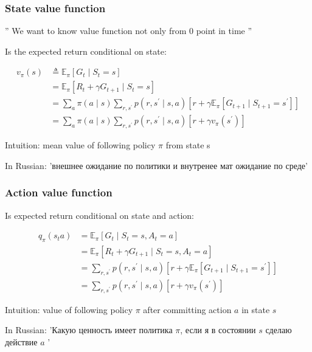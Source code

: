 \documentclass[a4paper,12pt]{article}
\begin{document}
	
	\subsubsection{State value function}
	
	
	''
	We want to know value function not only from 0 point in time
	''
	
	
	Is the expected return conditional on state: 
	
	$$
	\begin{aligned}
		v_\pi(s) & \triangleq \mathbb{E}_\pi\left[G_t \mid S_t=s\right] \\
		& =\mathbb{E}_\pi\left[R_t+\gamma G_{t+1} \mid S_t=s\right] \\
		& =\sum_a \pi(a \mid s) \sum_{r, s^{\prime}} p\left(r, s^{\prime} \mid s, a\right)\left[r+\gamma \mathbb{E}_\pi\left[G_{t+1} \mid S_{t+1}=s^{\prime}\right]\right] \\
		& =\sum_a \pi(a \mid s) \sum_{r, s^{\prime}} p\left(r, s^{\prime} \mid s, a\right)\left[r+\gamma v_\pi\left(s^{\prime}\right)\right]
	\end{aligned}
	$$
	
	Intuition: mean value of following policy $\pi$ from state s
	
	In Russian: 'внешнее ожидание по политики и внутренее мат ожидание по среде'
	
	
	
	\subsubsection{Action value function}
	
	Is expected return conditional on state and action:
	
	$$
	\begin{aligned}
		q_\pi\left(s_t a\right) & =\mathbb{E}_\pi\left[G_t \mid S_t=s, A_t=a\right] \\
		& =\mathbb{E}_\pi\left[R_t+\gamma G_{t+1} \mid S_t=s, A_t=a\right] \\
		& =\sum_{r, s^{\prime}} p\left(r, s^{\prime} \mid s, a\right)\left[r+\gamma \mathbb{E}_\pi\left[G_{t+1} \mid S_{t+1}=s^{\prime}\right]\right] \\
		& =\sum_{r, s^{\prime}} p\left(r, s^{\prime} \mid s, a\right)\left[r+\gamma v_\pi\left(s^{\prime}\right)\right]
	\end{aligned}
	$$
	
	Intuition: value of following policy $\pi$ after committing action $a$ in state $s$
	
	In Russian: 'Какую ценность имеет политика $\pi$, если я в состоянии $s$
	сделаю действие $a$ '
	
\end{document}
